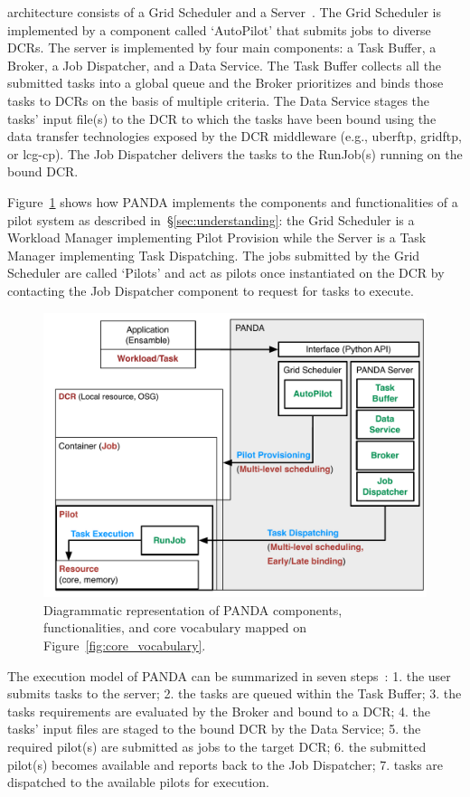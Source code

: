\documentclass{sig-alternate}
\begin{document}
\panda architecture consists of a Grid Scheduler and a \panda
Server~\cite{panda_architecture_url,maeno2011overview}. The Grid Scheduler is
implemented by a component called `AutoPilot' that submits jobs to diverse DCRs.
The \panda server is implemented by four main components: a Task Buffer, a
Broker, a Job Dispatcher, and a Data Service. The Task Buffer collects all the
submitted tasks into a global queue and the Broker prioritizes and binds those
tasks to DCRs on the basis of multiple criteria. The Data Service stages the
tasks' input file(s) to the DCR to which the tasks have been bound using the
data transfer technologies exposed by the DCR middleware (e.g., uberftp,
gridftp, or lcg-cp). The Job Dispatcher delivers the tasks to the RunJob(s)
running on the bound DCR.

Figure~\ref{fig:panda_comparison} shows how PANDA implements the components and
functionalities of a pilot system as described in~\S\ref{sec:understanding}: the
Grid Scheduler is a Workload Manager implementing Pilot Provision while the
\panda Server is a Task Manager implementing Task Dispatching. The jobs
submitted by the Grid Scheduler are called `Pilots' and act as pilots once
instantiated on the DCR by contacting the Job Dispatcher component to request
for tasks to execute.

\begin{figure}[t]
    \centering
        \includegraphics[width=.48\textwidth]{figures/panda_comparison.pdf}
    \caption{Diagrammatic representation of PANDA components, functionalities,
    and core vocabulary mapped on Figure~\ref{fig:core_vocabulary}.}
    \label{fig:panda_comparison}
\end{figure}

The execution model of PANDA can be summarized in seven
steps~\cite{nilsson2011atlas,pandarun_url}: 1. the user submits tasks to the
\panda server; 2. the tasks are queued within the Task Buffer; 3. the tasks
requirements are evaluated by the Broker and bound to a DCR; 4. the tasks' input
files are staged to the bound DCR by the Data Service; 5. the required pilot(s)
are submitted as jobs to the target DCR; 6. the submitted pilot(s) becomes
available and reports back to the Job Dispatcher; 7. tasks are dispatched to the
available pilots for execution.
\end{document}
